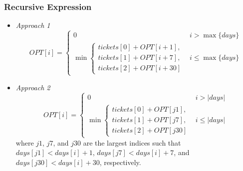 \documentclass{article}
\begin{document}
\subsubsection*{Recursive Expression}
\begin{itemize}


\item\textit{Approach 1}
$$
 OPT[i] =
    \begin{cases}
      0 & i > \max\{days\}\\
      \min 
      \begin{cases}
      	tickets[0] + OPT[i+1], \\
      	tickets[1] + OPT[i+7] ,\\
      	tickets[2] + OPT[i+30]
      \end{cases} 
       & i \leq \max\{days\}
    \end{cases} 
$$

\item\textit{Approach 2}
$$
 OPT[i] =
    \begin{cases}
      0 & i > |days|\\
      \min 
      \begin{cases}
      	tickets[0] + OPT[j1], \\
      	tickets[1] + OPT[j7] ,\\
      	tickets[2] + OPT[j30]
      \end{cases} 
       & i \leq |days|
    \end{cases} 
$$
where $j1$, $j7$, and $j30$ are the largest indices such that $days[j1] < days[i] + 1$, $days[j7] < days[i] + 7$, and $days[j30] < days[i] + 30$, respectively.

\end{itemize}
\end{document}
